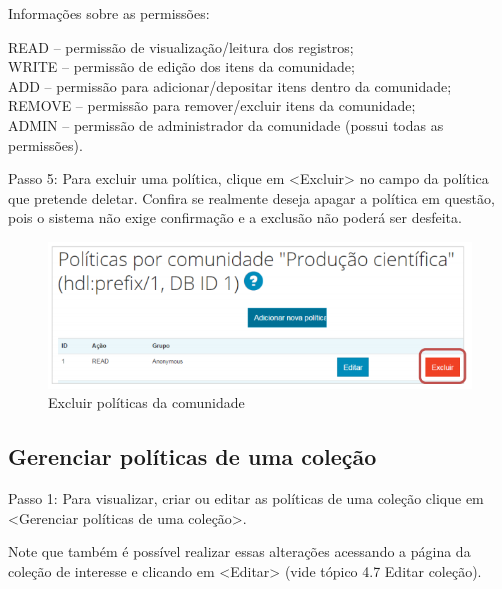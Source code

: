 \documentclass[12pt,hidelinks]{article}
\begin{document}
    Informações sobre as permissões:
    
    \singlespacing
    
    READ – permissão de visualização/leitura dos registros; \\
    WRITE – permissão de edição dos itens da comunidade; \\
    ADD – permissão para adicionar/depositar itens dentro da comunidade; \\
    REMOVE – permissão para remover/excluir itens da comunidade; \\
    ADMIN – permissão de administrador da comunidade (possui todas as permissões).
    
    \singlespacing
    
    Passo 5: Para excluir uma política, clique em <Excluir> no campo da política que pretende deletar. Confira se realmente deseja apagar a política em questão, pois o sistema não exige confirmação e a exclusão não poderá ser desfeita.
    
    \begin{figure}[!htp]
                \centering
                \includegraphics[scale=0.8]{figura/Figura77.png}
                \caption{Excluir políticas da comunidade}
            \label{Rotulo}
        \end{figure}

\newpage
    
    \subsection{Gerenciar políticas de uma coleção}
    
    Passo 1: Para visualizar, criar ou editar as políticas de uma coleção clique em <Gerenciar políticas de uma coleção>.
    
    Note que também é possível realizar essas alterações acessando a página da coleção de interesse e clicando em <Editar> (vide tópico 4.7 Editar coleção).
    
\end{document}
